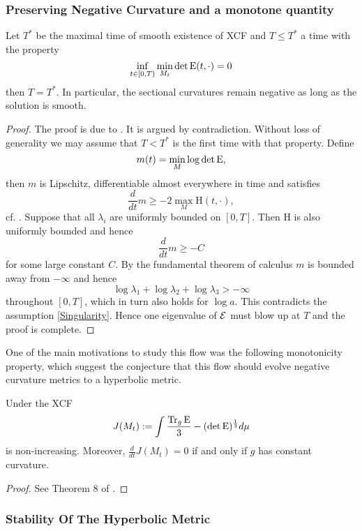 \documentclass[a4paper,12pt]{amsart}
\begin{document}
\subsubsection{Preserving Negative Curvature and a monotone quantity}
\label{subsec:xcf_preserving}
\begin{prop}
Let $T^{\ast}$ be the maximal time of smooth existence of XCF and $T\leq T^{\ast}$ a time with the property
\begin{equation}\label{Singularity}\inf_{t\in[0,T)}\min_{M_t}\det \operatorname{E}(t,\cdot)=0
\end{equation}
then $T=T^\ast$. In particular, the sectional curvatures remain negative as long as the solution is smooth.
\end{prop}
\begin{proof}
The proof is due to \cite{MR2055396}. It is argued by contradiction.
Without loss of generality we may assume that $T<T^\ast$ is the first time with that property. Define
\[m(t)=\min_{M}\log \det \operatorname{E},\]
then $m$ is Lipschitz, differentiable almost everywhere in time and satisfies
\[\frac{d}{dt} m\geq -2\max_{M}\mathrm{H}(t,\cdot),\]
cf. \cite[Proposition 9]{MR2055396}. Suppose that all $\lambda_i$ are uniformly bounded on $[0,T]$. Then $\mathrm{H}$ is also uniformly bounded and hence
\[\frac{d}{dt}m\geq -C\] for some large constant $C$. By the fundamental theorem of calculus $m$ is bounded away from $-\infty$ and hence
\[\log \lambda_1+\log \lambda_2+\log \lambda_3>-\infty\]
throughout $[0,T]$, which in turn also holds for $\log a$. This contradicts the assumption \eqref{Singularity}. Hence one eigenvalue of \(\operatorname{\mathcal{E}}\) must blow up at $T$ and the proof is complete.
\end{proof}

One of the main motivations to study this flow was the following monotonicity property, which suggest the conjecture that this flow should evolve negative curvature metrics to a hyperbolic metric.


\begin{thm}\label{thm:hyperbolicity}
Under the XCF
\[J(M_t):=\int \frac{\operatorname{Tr}_g\operatorname{E}}{3}- (\det\operatorname{E})^{\frac{1}{3}}d\mu\]
is non-increasing. Moreover, \(\frac{d}{dt}J(M_t) = 0\) if and only if $g$ has constant curvature.
\end{thm}
\begin{proof}
See Theorem 8 of \cite{MR2055396}.
\end{proof}


\subsubsection{Stability Of The Hyperbolic Metric}
\label{subsec:xcf_stability}
\end{document}

